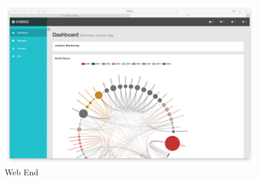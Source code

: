 \documentclass{article}
\begin{document}
 	 \begin{figure}[H]
 	 \centering
 		\includegraphics[width=\linewidth]{img/social2.png}
 		\caption{Web End}
 	\end{figure}
 	
\end{document}
